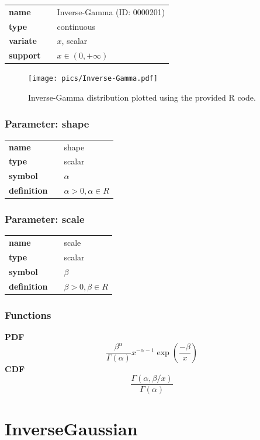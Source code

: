 \documentclass{article}
\begin{document}
  \bigskip 

\begin{tabular}{p{2cm}cl}
\textbf{name} & & Inverse-Gamma (ID: 0000201)\\ 
 
\textbf{type} & & continuous \\ 

\textbf{variate} & & $x$, scalar \\ 

\textbf{support} & & $x \in (0,+\infty)$
\end{tabular}

\begin{figure}[ht!]
\centering
  \texttt{[image: pics/Inverse-Gamma.pdf]}
 \caption{Inverse-Gamma distribution plotted using the provided R code.}
 \label{fig:Inverse-Gamma}
\end{figure}

\subsubsection*{Parameter: shape}

\noindent\begin{tabular}{p{2cm}cl}
\textbf{name} & & shape \\
\textbf{type} & & scalar \\
\textbf{symbol} & & $\alpha$  \\
\textbf{definition} & & $\alpha>0, \alpha \in  R$
\end{tabular}
\subsubsection*{Parameter: scale}

\noindent\begin{tabular}{p{2cm}cl}
\textbf{name} & & scale \\
\textbf{type} & & scalar \\
\textbf{symbol} & & $\beta$  \\
\textbf{definition} & & $\beta>0, \beta \in  R$
\end{tabular}
\subsubsection*{Functions}

\smallskip \noindent \hspace{.2cm} \textbf{PDF} 
\begin{equation*}\frac{\beta^\alpha}{\Gamma(\alpha)} x^{-\alpha - 1} \exp \left(\frac{-\beta}{x}\right)\end{equation*}
\smallskip \noindent \hspace{.2cm} \textbf{CDF} 
\begin{equation*}\frac{\Gamma(\alpha, \beta/x)}{\Gamma(\alpha)}\end{equation*}
\smallskip\section*{InverseGaussian} 
\end{document}
